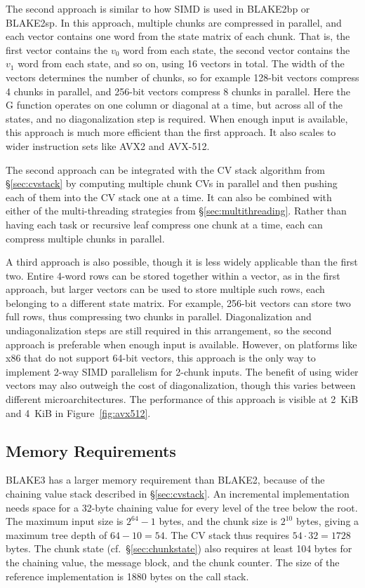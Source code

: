 \documentclass[11pt,notitlepage,a4paper]{article}
\begin{document}
The second approach is similar to how SIMD is used in BLAKE2bp or BLAKE2sp. In
this approach, multiple chunks are compressed in parallel, and each vector
contains one word from the state matrix of each chunk. That is, the first
vector contains the $v_0$ word from each state, the second vector contains the
$v_1$ word from each state, and so on, using 16 vectors in total. The width of
the vectors determines the number of chunks, so for example 128-bit vectors
compress 4 chunks in parallel, and 256-bit vectors compress 8 chunks in
parallel. Here the G function operates on one column or diagonal at a time, but
across all of the states, and no diagonalization step is required. When enough
input is available, this approach is much more efficient than the first
approach. It also scales to wider instruction sets like AVX2 and AVX-512.

The second approach can be integrated with the CV stack algorithm from
\S\ref{sec:cvstack} by computing multiple chunk CVs in parallel and then
pushing each of them into the CV stack one at a time. It can also be combined
with either of the multi-threading strategies from \S\ref{sec:multithreading}.
Rather than having each task or recursive leaf compress one chunk at a time,
each can compress multiple chunks in parallel.

A third approach is also possible, though it is less widely applicable than the
first two. Entire 4-word rows can be stored together within a vector, as in the
first approach, but larger vectors can be used to store multiple such rows,
each belonging to a different state matrix. For example, 256-bit vectors can
store two full rows, thus compressing two chunks in parallel. Diagonalization
and undiagonalization steps are still required in this arrangement, so the
second approach is preferable when enough input is available. However, on
platforms like x86 that do not support 64-bit vectors, this approach is the
only way to implement 2-way SIMD parallelism for 2-chunk inputs. The benefit of
using wider vectors may also outweigh the cost of diagonalization, though this
varies between different microarchitectures. The performance of this approach
is visible at 2~KiB and 4~KiB in Figure~\ref{fig:avx512}.

\subsection{Memory Requirements}\label{sec:memory}

BLAKE3 has a larger memory requirement than BLAKE2, because of the chaining
value stack described in \S\ref{sec:cvstack}. An incremental implementation
needs space for a 32-byte chaining value for every level of the tree below the
root. The maximum input size is $2^{64}-1$ bytes, and the chunk size is
$2^{10}$ bytes, giving a maximum tree depth of $64 - 10 = 54$. The CV stack
thus requires $54 \cdot 32 = 1728$ bytes. The chunk state
(cf.~\S\ref{sec:chunkstate}) also requires at least 104 bytes for the chaining
value, the message block, and the chunk counter. The size of the reference
implementation is 1880 bytes on the call stack.
\end{document}
